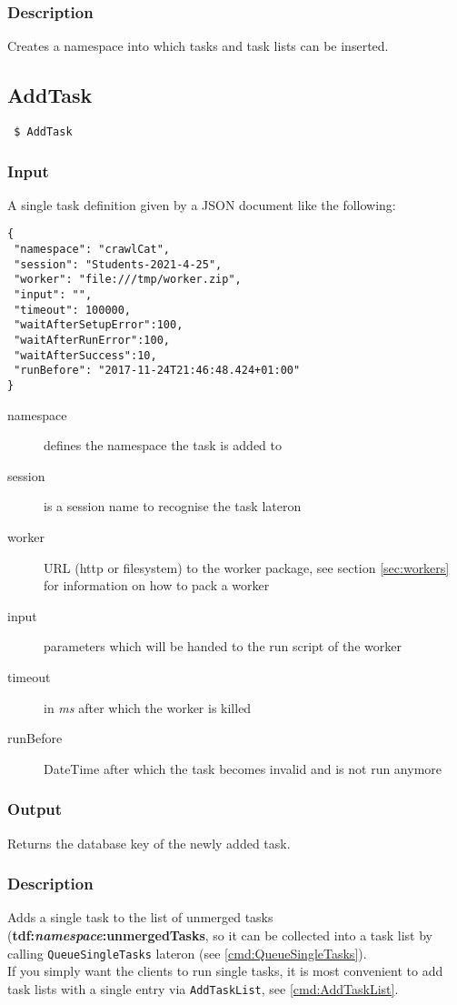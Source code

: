 \documentclass[a4paper,11pt]{article}
\begin{document}
\subsubsection{Description}
Creates a namespace into which tasks and task lists can be inserted.

\newpage


\subsection{AddTask\label{cmd:AddTask}}
\begin{verbatim}
 $ AddTask
\end{verbatim}

\subsubsection{Input}
A single task definition given by a JSON document like the following:
\begin{verbatim}
{
 "namespace": "crawlCat",
 "session": "Students-2021-4-25",
 "worker": "file:///tmp/worker.zip",
 "input": "",
 "timeout": 100000,
 "waitAfterSetupError":100,
 "waitAfterRunError":100,
 "waitAfterSuccess":10,
 "runBefore": "2017-11-24T21:46:48.424+01:00"
}
\end{verbatim}

\begin{description}
\item[namespace] defines the namespace the task is added to
\item[session] is a session name to recognise the task lateron
\item[worker] URL (http or filesystem) to the worker package, see section \ref{sec:workers} for information on how to pack a worker
\item[input] parameters which will be handed to the run script of the worker
\item[timeout] in \textit{ms} after which the worker is killed
\item[runBefore] DateTime after which the task becomes invalid and is not run anymore
\end{description}

\subsubsection{Output}
Returns the database key of the newly added task.

\subsubsection{Description}
Adds a single task to the list of unmerged tasks (\textbf{tdf:\textit{namespace}:unmergedTasks}, so it can be collected into a task list by calling \texttt{QueueSingleTasks} lateron (see \ref{cmd:QueueSingleTasks}).\\
If you simply want the clients to run single tasks, it is most convenient to add task lists with a single entry via \texttt{AddTaskList}, see \ref{cmd:AddTaskList}.
\end{document}
